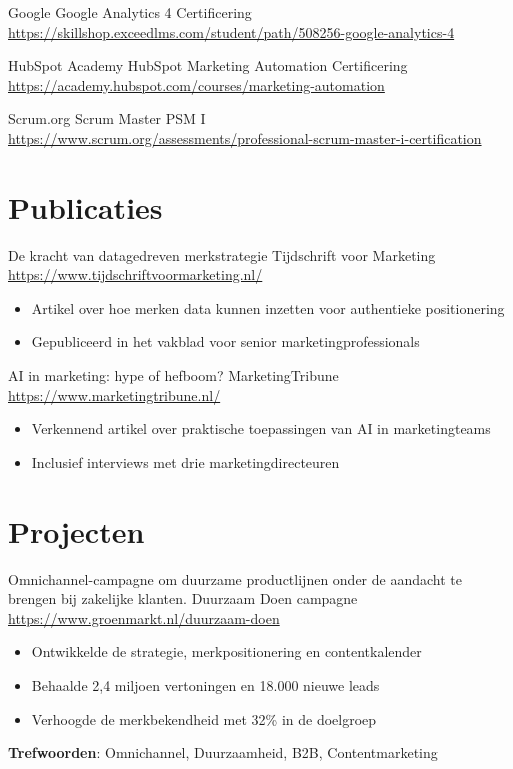 \documentclass[a4paper, serif, 10pt]{moderncv}
\begin{document}
        {Google}
        {Google Analytics 4 Certificering}
        {\url{https://skillshop.exceedlms.com/student/path/508256-google-analytics-4}}
        {}
        {}

        {HubSpot Academy}
        {HubSpot Marketing Automation Certificering}
        {\url{https://academy.hubspot.com/courses/marketing-automation}}
        {}
        {}

        {Scrum.org}
        {Scrum Master PSM I}
        {\url{https://www.scrum.org/assessments/professional-scrum-master-i-certification}}
        {}
        {}
\section{Publicaties}

        {De kracht van datagedreven merkstrategie}
        {Tijdschrift voor Marketing}
        {\url{https://www.tijdschriftvoormarketing.nl/}}
        {}
        {\begin{itemize}
\item Artikel over hoe merken data kunnen inzetten voor authentieke positionering
\item Gepubliceerd in het vakblad voor senior marketingprofessionals
\end{itemize}}

        {AI in marketing: hype of hefboom?}
        {MarketingTribune}
        {\url{https://www.marketingtribune.nl/}}
        {}
        {\begin{itemize}
\item Verkennend artikel over praktische toepassingen van AI in marketingteams
\item Inclusief interviews met drie marketingdirecteuren
\end{itemize}}
\section{Projecten}

        {Omnichannel-campagne om duurzame productlijnen onder de aandacht te brengen bij zakelijke klanten.}
        {Duurzaam Doen campagne}
        {\url{https://www.groenmarkt.nl/duurzaam-doen}}
        {}
        {\begin{itemize}
\item Ontwikkelde de strategie, merkpositionering en contentkalender
\item Behaalde 2,4 miljoen vertoningen en 18.000 nieuwe leads
\item Verhoogde de merkbekendheid met 32\% in de doelgroep
\end{itemize}
\textbf{Trefwoorden}: Omnichannel, Duurzaamheid, B2B, Contentmarketing}
\end{document}
